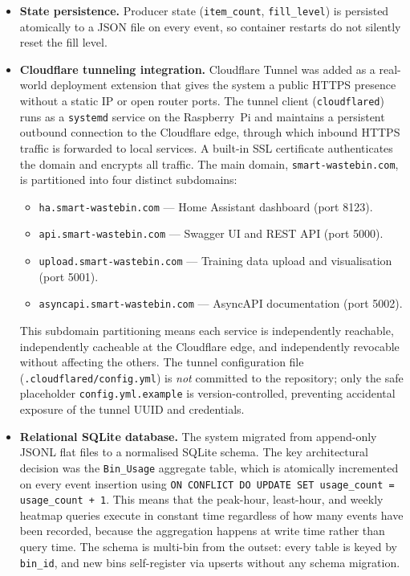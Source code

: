 \documentclass[10pt,a4paper]{article}
\begin{document}
\begin{itemize}
\item \textbf{State persistence.} Producer state (\texttt{item\_count},
\texttt{fill\_level}) is persisted atomically to a JSON file on every event,
so container restarts do not silently reset the fill level.

\item \textbf{Cloudflare tunneling integration.} Cloudflare Tunnel was added as a real-world deployment extension that gives the system a public HTTPS presence without a static IP or open router ports. The tunnel client (\texttt{cloudflared}) runs as a \texttt{systemd} service on the Raspberry~Pi and maintains a persistent outbound connection to the Cloudflare edge, through which inbound HTTPS traffic is forwarded to local services. A built-in SSL certificate authenticates the domain and encrypts all traffic. The main domain, \texttt{smart-wastebin.com}, is partitioned into four distinct subdomains:

\begin{itemize}
\item \texttt{ha.smart-wastebin.com} --- Home Assistant dashboard (port 8123).
\item \texttt{api.smart-wastebin.com} --- Swagger UI and REST API (port 5000).
\item \texttt{upload.smart-wastebin.com} --- Training data upload and visualisation (port 5001).
\item \texttt{asyncapi.smart-wastebin.com} --- AsyncAPI documentation (port 5002).
\end{itemize}

This subdomain partitioning means each service is independently reachable, independently cacheable at the Cloudflare edge, and independently revocable without affecting the others. The tunnel configuration file (\texttt{.cloudflared/config.yml}) is \textit{not} committed to the repository; only the safe placeholder \texttt{config.yml.example} is version-controlled, preventing accidental exposure of the tunnel UUID and credentials.

\item \textbf{Relational SQLite database.} The system migrated from append-only JSONL flat files to a normalised SQLite schema. The key architectural decision was the \texttt{Bin\_Usage} aggregate table, which is atomically incremented on every event insertion using \texttt{ON CONFLICT DO UPDATE SET usage\_count = usage\_count + 1}. This means that the peak-hour, least-hour, and weekly heatmap queries execute in constant time regardless of how many events have been recorded, because the aggregation happens at write time rather than query time. The schema is multi-bin from the outset: every table is keyed by \texttt{bin\_id}, and new bins self-register via upserts without any schema migration.


\end{itemize}
\end{document}
